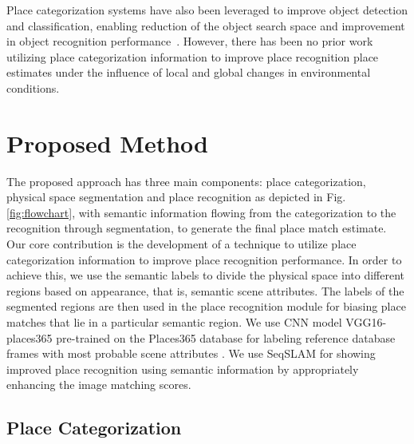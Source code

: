 \documentclass[letterpaper, 10 pt, conference]{ieeeconf}  %
\begin{document}
Place categorization systems have also been leveraged to improve object detection and classification, enabling reduction of the object search space and improvement in object recognition performance~\cite{torralba2003context}. However, there has been no prior work utilizing place categorization information to improve place recognition place estimates under the influence of local and global changes in environmental conditions. 

\section{Proposed Method}
The proposed approach has three main components: place categorization, physical space segmentation and place recognition as depicted in Fig. \ref{fig:flowchart}, with semantic information flowing from the categorization to the recognition through segmentation, to generate the final place match estimate. Our core contribution is the development of a technique to utilize place categorization information to improve place recognition performance. In order to achieve this, we use the semantic labels to divide the physical space into different regions based on appearance, that is, semantic scene attributes. The labels of the segmented regions are then used in the place recognition module for biasing place matches that lie in a particular semantic region. We use CNN model VGG16-places365 \cite{cnnPlaces365Github} pre-trained on the Places365 database \cite{zhou2014learning} for labeling reference database frames with most probable scene attributes \cite{Patterson2012SunAttributes}. We use SeqSLAM \cite{Milford2012} for showing improved place recognition using semantic information by appropriately enhancing the image matching scores.

\subsection{Place Categorization}
\end{document}
